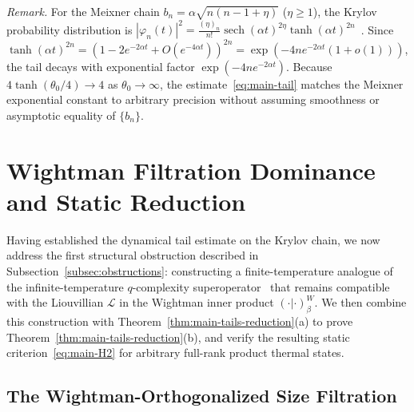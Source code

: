 \documentclass[11pt,a4paper]{article}
\numberwithin{equation}{section}
\theoremstyle{plain}
\theoremstyle{definition}
\newcommand{\sech}{\operatorname{sech}}
\begin{document}
\noindent\emph{Remark.}
For the Meixner chain $b_n = \alpha\sqrt{n(n-1+\eta)}$ ($\eta\ge 1$), the Krylov probability distribution is $|\varphi_n(t)|^2 = \frac{(\eta)_n}{n!}\sech(\alpha t)^{2\eta}\tanh(\alpha t)^{2n}$~\cite{Parker2019}. Since $\tanh(\alpha t)^{2n} = (1 - 2e^{-2\alpha t} + O(e^{-4\alpha t}))^{2n} = \exp(-4ne^{-2\alpha t}(1+o(1)))$, the tail decays with exponential factor $\exp(-4ne^{-2\alpha t})$. Because $4\tanh(\theta_0/4) \to 4$ as $\theta_0\to\infty$, the estimate~\eqref{eq:main-tail} matches the Meixner exponential constant to arbitrary precision without assuming smoothness or asymptotic equality of $\{b_n\}$.

\section{Wightman Filtration Dominance and Static Reduction}\label{sec:filtration}

Having established the dynamical tail estimate on the Krylov chain, we now address the first structural obstruction described in Subsection~\ref{subsec:obstructions}: constructing a finite-temperature analogue of the infinite-temperature $q$-complexity superoperator~\cite[App.~E]{Parker2019} that remains compatible with the Liouvillian $\mathcal{L}$ in the Wightman inner product $(\cdot|\cdot)_\beta^W$. We then combine this construction with Theorem~\ref{thm:main-tails-reduction}(a) to prove Theorem~\ref{thm:main-tails-reduction}(b), and verify the resulting static criterion~\eqref{eq:main-H2} for arbitrary full-rank product thermal states.

\subsection{The Wightman-Orthogonalized Size Filtration}\label{subsec:wightman-filtration}
\end{document}
